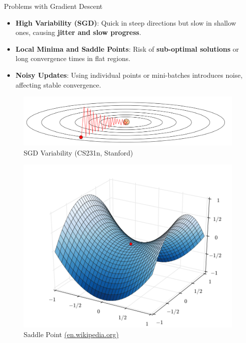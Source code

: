 \documentclass[serif, aspectratio=169]{beamer}
\begin{document}
\begin{frame}{Problems with Gradient Descent}
    \begin{itemize}
        \item \textbf{High Variability (SGD)}: Quick in steep directions but slow in shallow ones, causing \textbf{jitter and slow progress}.
        \item \textbf{Local Minima and Saddle Points}: Risk of \textbf{sub-optimal solutions} or long convergence times in flat regions.
        \item \textbf{Noisy Updates}: Using individual points or mini-batches introduces noise, affecting stable convergence.
    \end{itemize}
    \vfill
    \begin{minipage}{0.5\linewidth}
        \begin{figure}[h]
        \centering
        \includegraphics[width=1\linewidth]{pic/sgd_stanford.png}
        \caption{\footnotesize SGD Variability (CS231n, Stanford)}
        \end{figure}
    \end{minipage}%
    \hfill
    \begin{minipage}{0.5\linewidth}
        \begin{figure}
        \centering
        \includegraphics[width=0.5\linewidth]{pic/saddle_wiki.png}
        \caption{\footnotesize Saddle Point \url{(en.wikipedia.org)}}
        \end{figure}
    \end{minipage}
\end{frame}
\end{document}
